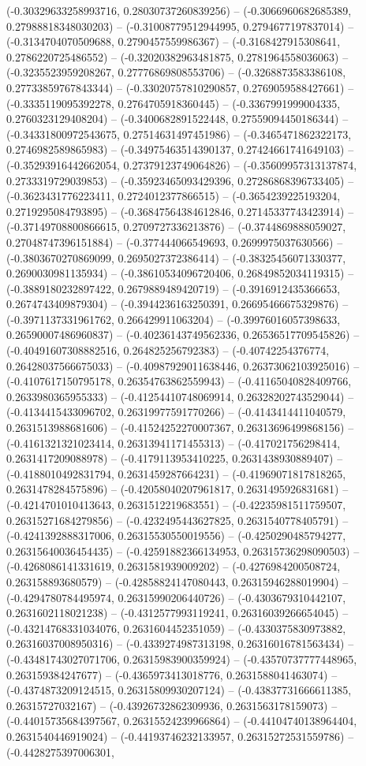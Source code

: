 (-0.30329633258993716, 0.28030737260839256) -- (-0.3066960682685389, 0.27988818348030203) -- (-0.31008779512944995, 0.2794677197837014) -- (-0.3134704070509688, 0.2790457559986367) -- (-0.3168427915308641, 0.2786220725486552) -- (-0.32020382963481875, 0.2781964558036063) -- (-0.3235523959208267, 0.27776869808553706) -- (-0.3268873583386108, 0.27733859767843344) -- (-0.33020757810290857, 0.2769059588427661) -- (-0.3335119095392278, 0.2764705918360445) -- (-0.3367991999004335, 0.2760323129408204) -- (-0.3400682891522448, 0.27559094450186344) -- (-0.34331800972543675, 0.27514631497451986) -- (-0.3465471862322173, 0.2746982589865983) -- (-0.34975463514390137, 0.27424661741649103) -- (-0.35293916442662054, 0.27379123749064826) -- (-0.35609957313137874, 0.2733319729039853) -- (-0.35923465093429396, 0.27286868396733405) -- (-0.3623431776223411, 0.2724012377866515) -- (-0.3654239225193204, 0.2719295084793895) -- (-0.36847564384612846, 0.27145337743423914) -- (-0.37149708800866615, 0.2709727336213876) -- (-0.3744869888059027, 0.27048747396151884) -- (-0.377444066549693, 0.2699975037630566) -- (-0.3803670270869099, 0.2695027372386414) -- (-0.38325456071330377, 0.2690030981135934) -- (-0.38610534096720406, 0.26849852034119315) -- (-0.3889180232897422, 0.2679889489420719) -- (-0.3916912435366653, 0.2674743409879304) -- (-0.3944236163250391, 0.26695466675329876) -- (-0.3971137331961762, 0.266429911063204) -- (-0.39976016057398633, 0.26590007486960837) -- (-0.40236143749562336, 0.26536517709545826) -- (-0.40491607308882516, 0.264825256792383) -- (-0.40742254376774, 0.26428037566675033) -- (-0.40987929011638446, 0.26373062103925016) -- (-0.4107617150795178, 0.26354763862559943) -- (-0.41165040828409766, 0.2633980365955333) -- (-0.41254410748069914, 0.26328202743529044) -- (-0.4134415433096702, 0.26319977591770266) -- (-0.4143414411040579, 0.2631513988681606) -- (-0.41524252270007367, 0.26313696499868156) -- (-0.4161321321023414, 0.26313941171455313) -- (-0.417021756298414, 0.2631417209088978) -- (-0.4179113953410225, 0.2631438930889407) -- (-0.4188010492831794, 0.2631459287664231) -- (-0.41969071817818265, 0.2631478284575896) -- (-0.42058040207961817, 0.2631495926831681) -- (-0.4214701010413643, 0.2631512219683551) -- (-0.42235981511759507, 0.26315271684279856) -- (-0.4232495443627825, 0.2631540778405791) -- (-0.4241392888317006, 0.26315530550019556) -- (-0.4250290485794277, 0.26315640036454435) -- (-0.42591882366134953, 0.26315736298090503) -- (-0.4268086141331619, 0.2631581939009202) -- (-0.4276984200508724, 0.263158893680579) -- (-0.42858824147080443, 0.26315946288019904) -- (-0.4294780784495974, 0.26315990206440726) -- (-0.4303679310442107, 0.2631602118021238) -- (-0.4312577993119241, 0.26316039266654045) -- (-0.43214768331034076, 0.2631604452351059) -- (-0.4330375830973882, 0.26316037008950316) -- (-0.4339274987313198, 0.26316016781563434) -- (-0.43481743027071706, 0.26315983900359924) -- (-0.43570737777448965, 0.263159384247677) -- (-0.4365973413018776, 0.2631588041463074) -- (-0.4374873209124515, 0.26315809930207124) -- (-0.43837731666611385, 0.26315727032167) -- (-0.43926732862309936, 0.2631563178159073) -- (-0.44015735684397567, 0.26315524239966864) -- (-0.44104740138964404, 0.2631540446919024) -- (-0.44193746232133957, 0.26315272531559786) -- (-0.4428275397006301, 